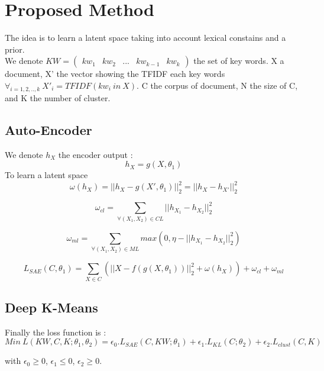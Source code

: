 \section{Proposed Method}
The idea is to learn a latent space taking into account lexical constains and
a prior.
\\
We denote $KW = \begin{pmatrix} kw_1 & kw_2 & ... & kw_{k-1} & kw_{k}
\end {pmatrix}$
the set of key words. X a document,
X' the vector showing the TFIDF each key words
$\forall_{i=1, 2, .., k}~X'_i =TFIDF(kw_i~in~X)$.
C the corpus of document, N the size of C, and K the number of cluster.
\subsection{Auto-Encoder}
We denote $h_X$ the encoder output : 
\begin{equation}\label{eq:h}
  h_X = g(X,\theta_1)
\end{equation}
To learn a latent space 
\begin{equation}\label{eq:omega1}
  \omega(h_X) = || h_X - g(X',\theta_1) ||_2^2 = || h_X - h_{X'}||_2^2
\end{equation}

\begin{equation}\label{eq:omegaCL}
  \omega_{cl} = \sum_{\forall{(X_1,X_2)\in CL}} || h_{X_1} - h_{X_2} ||_2^2
\end{equation}

\begin{equation}\label{eq:omegaML}
  \omega_{ml} = \sum_{\forall{(X_1,X_2)\in ML}} max(0,
  \eta - || h_{X_1} - h_{X_2} ||_2^2)
\end{equation}

\begin{equation}\label{eq:Sparse}
  L_{SAE}(C, \theta_1) = \sum_{X \in C}(||X - f(g(X, \theta_1))||_2^2
  + \omega(h_X)) + \omega_{cl} + \omega_{ml}  
\end{equation}

\subsection{Deep K-Means}

Finally the loss function is :
\begin{equation}\label{eq:loss_FINALE}
  Min~L(KW, C, K; \theta_1, \theta_2) = \epsilon_0.L_{SAE}(C, KW; \theta_1) 
  + \epsilon_1.L_{KL}(C; \theta_2) + \epsilon_2.L_{clust}(C,K)
\end{equation}

with $\epsilon_0 \geq 0$, $\epsilon_1 \leq 0$, $\epsilon_2 \geq 0$.
